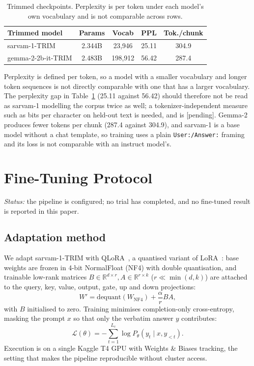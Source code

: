 \documentclass[10pt,twocolumn,letterpaper]{article}
\begin{document}
\begin{table}[t]
\centering
\small
\setlength{\tabcolsep}{4pt}
\begin{tabular}{@{}lcccc@{}}
\toprule
\textbf{Trimmed model} & \textbf{Params} & \textbf{Vocab} & \textbf{PPL} & \textbf{Tok./chunk} \\
\midrule
sarvam-1-TRIM        & 2.344B &  23{,}946 & 25.11 & 304.9 \\
gemma-2-2b-it-TRIM   & 2.483B & 198{,}912 & 56.42 & 287.4 \\
\bottomrule
\end{tabular}
\caption{Trimmed checkpoints. Perplexity is per token under each model's own
vocabulary and is not comparable across rows.}
\label{tab:trimmed}
\end{table}

Perplexity is defined per token, so a model with a smaller vocabulary and longer
token sequences is not directly comparable with one that has a larger vocabulary.
The perplexity gap in Table~\ref{tab:trimmed} (25.11 against 56.42) should therefore
not be read as sarvam-1 modelling the corpus twice as well; a tokenizer-independent
measure such as bits per character on held-out text is needed, and is [pending].
Gemma-2 produces fewer tokens per chunk (287.4 against 304.9), and sarvam-1 is a
base model without a chat template, so training uses a plain \texttt{User:/Answer:}
framing and its loss is not comparable with an instruct model's.

\section{Fine-Tuning Protocol}
\label{sec:finetune}

\noindent\textit{Status:} the pipeline is configured; no trial has completed,
and no fine-tuned result is reported in this paper.

\subsection{Adaptation method}

We adapt sarvam-1-TRIM with QLoRA~\cite{qlora}, a quantised variant of
LoRA~\cite{lora}: base weights are frozen in 4-bit NormalFloat (NF4) with double
quantisation, and trainable low-rank matrices $B \in \mathbb{R}^{d \times r},
A \in \mathbb{R}^{r \times k}$ ($r \ll \min(d, k)$) are attached to the query,
key, value, output, gate, up and down projections:
\begin{equation}
W' = \text{dequant}(W_{\text{NF4}}) + \frac{\alpha}{r} B A,
\end{equation}
with $B$ initialised to zero. Training minimises completion-only cross-entropy,
masking the prompt $x$ so that only the verbatim answer $y$ contributes:
\begin{equation}
\mathcal{L}(\theta) = - \sum_{t=1}^{L_c} \log P_\theta(y_t \mid x, y_{<t}).
\end{equation}
Execution is on a single Kaggle T4 GPU with Weights \& Biases tracking, the setting
that makes the pipeline reproducible without cluster access.
\end{document}
